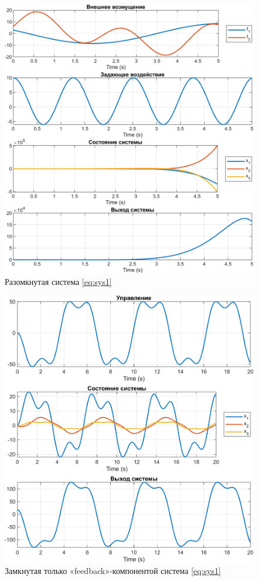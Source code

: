 \begin{figure}[H]
    \centering
    \includegraphics[width=\linewidth]{figs/10_sim.png}
    \caption{Разомкнутая система \eqref{eq:sys1}}
    \label{fig:10sim}
\end{figure}
\begin{figure}[H]
    \centering
    \includegraphics[width=\linewidth]{figs/11_sim.png}
    \caption{Замкнутая только «feedback»-компонентой система \eqref{eq:sys1}}
    \label{fig:11sim}
\end{figure}
